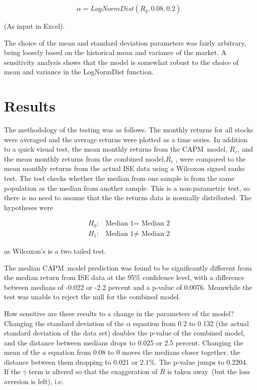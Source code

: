 \documentclass{ucthesis}
\begin{document}
\begin{equation}
\alpha =LogNormDist(R_{q},0.08,0.2)
\end{equation}

(As input in Excel).

The choice of the mean and standard deviation parameters was fairly
arbitrary, being loosely based on the historical mean and variance of the
market. A sensitivity analysis shows that the model is somewhat robust to
the choice of mean and variance in the LogNormDist function.

\section{Results}

The methodology of the testing was as follows. The monthly returns for all
stocks were averaged and the average returns were plotted as a time series.
In addition to a quick visual test, the mean monthly returns from the CAPM\
model, $R_{r}$, and the mean monthly returns from the combined model,$R_{c}$%
, were compared to the mean monthly returns from the actual ISE data using a
Wilcoxon signed ranks test. The test checks whether the median from one
sample is from the same population as the median from another sample. This
is a non-parametric test, so there is no need to assume that the the returns
data is normally distributed. The hypotheses were

\[
\begin{array}{cc}
H_{0}: & \text{Median 1}=\text{ Median 2} \\ 
H_{1}: & \text{Median 1}\neq \text{ Median 2}%
\end{array}%
\]

as Wilcoxon's is a two tailed test.

The median CAPM\ model prediction was found to be significantly different
from the median return from ISE data at the 95\% confidence level, with a
difference between medians of -0.022 or -2.2 percent and a p-value of
0.0076. Meanwhile the test was unable to reject the null for the combined
model.

How sensitive are these results to a change in the parameters of the model?
Changing the standard deviation of the $\alpha $ equation from 0.2 to 0.132
(the actual standard deviation of the data set) doubles the p-value of the
combined model, and the distance between medians drops to 0.025 or 2.5
percent. Changing the mean of the $a$ equation from 0.08 to 0 moves the
medians closer together, the distance between them dropping to 0.021 or
2.1\%. The p-value jumps to 0.2204. If the $\gamma $ term is altered so that
the exaggeration of $\overline{R}$ is taken away\ (but the loss aversion is
left), i.e.
\end{document}
